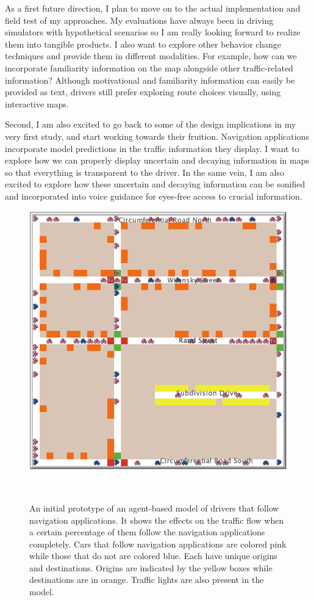 As a first future direction, I plan to move on to the actual implementation and field test of my approaches. My evaluations have always been in driving simulators with hypothetical scenarios so I am really looking forward to realize them into tangible products. I also want to explore other behavior change techniques and provide them in different modalities. For example, how can we incorporate familiarity information on the map alongside other traffic-related information? Although motivational and familiarity information can easily be provided as text, drivers still prefer exploring route choices visually, using interactive maps. 

Second, I am also excited to go back to some of the design implications in my very first study, and start working towards their fruition. Navigation applications incorporate model predictions in the traffic information they display. I want to explore how we can properly display uncertain and decaying information in maps so that everything is transparent to the driver. In the same vein, I am also excited to explore how these uncertain and decaying information can be sonified and incorporated into voice guidance for eyes-free access to crucial information.

\begin{figure}[h]
\centering
  \includegraphics[scale=.8]{figures/conclusion-abm.png}
  \caption{An initial prototype of an agent-based model of drivers that follow navigation applications. It shows the effects on the traffic flow when a certain percentage of them follow the navigation applications completely. Cars that follow navigation applications are colored pink while those that do not are colored blue. Each have unique origins and destinations. Origins are indicated by the yellow boxes while destinations are in orange. Traffic lights are also present in the model.}~\label{fig:abm}
\end{figure}

